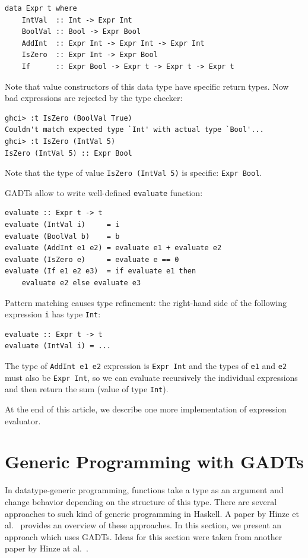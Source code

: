 \documentclass{tmr}
\begin{document}
\begin{Verbatim}
data Expr t where
    IntVal  :: Int -> Expr Int
    BoolVal :: Bool -> Expr Bool
    AddInt  :: Expr Int -> Expr Int -> Expr Int
    IsZero  :: Expr Int -> Expr Bool
    If      :: Expr Bool -> Expr t -> Expr t -> Expr t
\end{Verbatim}

Note that value constructors of this data type have specific return types. Now bad expressions are rejected by the type checker:

\begin{Verbatim}
ghci> :t IsZero (BoolVal True)
Couldn't match expected type `Int' with actual type `Bool'...
ghci> :t IsZero (IntVal 5)
IsZero (IntVal 5) :: Expr Bool
\end{Verbatim}

Note that the type of value \verb|IsZero (IntVal 5)| is specific: \verb|Expr Bool|.

GADTs allow to write well-defined \verb|evaluate| function:

\begin{Verbatim}
evaluate :: Expr t -> t
evaluate (IntVal i)     = i
evaluate (BoolVal b)    = b
evaluate (AddInt e1 e2) = evaluate e1 + evaluate e2
evaluate (IsZero e)     = evaluate e == 0
evaluate (If e1 e2 e3)  = if evaluate e1 then
    evaluate e2 else evaluate e3
\end{Verbatim}

Pattern matching causes type refinement: the right-hand side of the following expression \verb|i| has type \verb|Int|:

\begin{Verbatim}
evaluate :: Expr t -> t
evaluate (IntVal i) = ...
\end{Verbatim}

The type of \verb|AddInt e1 e2| expression is \verb|Expr Int| and the types of \verb|e1| and \verb|e2| must also be \verb|Expr Int|, so we can evaluate recursively the individual expressions and then return the sum (value of type \verb|Int|).

At the end of this article, we describe one more implementation of expression evaluator.

\section{Generic Programming with GADTs}
\label{sec:generic_programming}

In datatype-generic programming, functions take a type as an argument and change behavior depending on the structure of this type. There are several approaches to such kind of generic programming in Haskell. A paper by Hinze et al.~\cite{generic_programming} provides an overview of these approaches. In this section, we present an approach which uses GADTs. Ideas for this section were taken from another paper by Hinze at al.~\cite{fun_with_phantom_types}.
\end{document}
